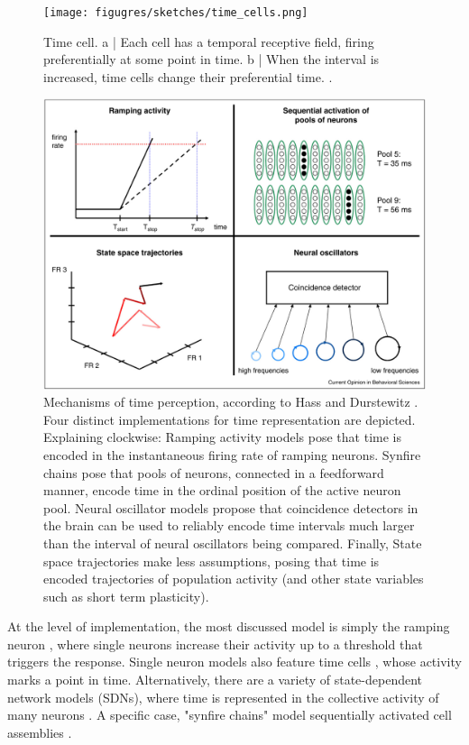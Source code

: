     \begin{figure}
        \centering
        \texttt{[image: figugres/sketches/time\_cells.png]}
        \caption[Time cells]{Time cell. a | Each cell has a temporal receptive field, firing preferentially at some point in time. b | When the interval is increased, time cells change their preferential time. \cite{eichenbaum2014time}.}
        \label{fig:timecells}
    \end{figure}

    \begin{figure}[ht]
        \centering
        \includegraphics[width=\textwidth]{figures/sketches/kinds_of_timing_models.png}
        \caption[Mechanisms of time perception]{Mechanisms of time perception, according to Hass and Durstewitz \cite{hass2014neurocomputational}. Four distinct implementations for time representation are depicted. Explaining clockwise: Ramping activity models pose that time is encoded in the instantaneous firing rate of ramping neurons. Synfire chains pose that pools of neurons, connected in a feedforward manner, encode time in the ordinal position of the active neuron pool. Neural oscillator models propose that coincidence detectors in the brain can be used to reliably encode time intervals much larger than the interval of neural oscillators being compared. Finally, State space trajectories make less assumptions, posing that time is encoded trajectories of population activity (and other state variables such as short term plasticity).}
        \label{fig:my_label}
    \end{figure}

    At the level of implementation, the most discussed model is simply the ramping neuron \cite{hass2014neurocomputational}, where single neurons increase their activity up to a threshold that triggers the response. Single neuron models also feature time cells \cite{tiganj2016sequential}, whose activity marks a point in time. Alternatively, there are a variety of state-dependent network models (SDNs), where time is represented in the collective activity of many neurons \cite{hardy2016neurocomputational}. A specific case, "synfire chains" model sequentially activated cell assemblies \cite{paton2018neural}.
    
